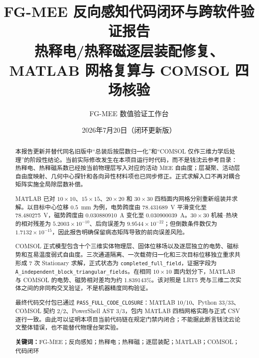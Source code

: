 \documentclass[UTF8,fontset=windows,12pt,a4paper]{ctexart}
\title{\textbf{FG-MEE 反向感知代码闭环与跨软件验证报告}\\[0.45em]
\large 热释电/热释磁逐层装配修复、MATLAB 网格复算与 COMSOL 四场核验}
\author{FG-MEE 数值验证工作台}
\date{2026年7月20日（闭环更新版）}
\begin{document}
\maketitle

\begin{abstract}
本报告更新并替代同名旧版中“总装后按层数归一化”和“COMSOL 仅作三维力学后处理”的阶段性结论。当前实际修改发生在本项目运行时代码，而不是钱沈云参考目录：热释电、热释磁系数已经按当前物理层写入对应的活动 MEE 自由度；层凝聚、活动层自由度映射、几何中心探针和各向异性材料项也已同步修正。正式求解入口不再对耦合矩阵实施全局除层数补偿。

MATLAB 已对 $10\times10$、$15\times15$、$20\times20$ 和 $30\times30$ 四档面内网格分别重新组装并求解。以目标中心位移 $0.5$~mm 为例，电势跨度由 78.431689~V 平滑变化至 78.480275~V，磁势跨度由 0.030880910~A 变化至 0.030900039~A。$30\times30$ 机械--热块的相对残差为 $5.2003\times10^{-10}$、后向误差为 $9.9544\times10^{-22}$；但倒数条件数仅为 $1.7132\times10^{-15}$，因此报告明确保留病态矩阵导致的前向误差风险。

COMSOL 正式模型包含十个三维实体物理层、固体位移场以及逐层独立的电势、磁标势和互易温度弱式自由度。三次通道隔离、一次载荷归一化和三次目标位移独立重求共形成 7 次 Stationary 求解，正式状态为 \texttt{completed\_full\_field}，证据字段为 \texttt{A\_independent\_block\_triangular\_fields}。在相同 $10\times10$ 面内划分下，MATLAB 与 COMSOL 的电势、磁势相对差均为约 1.839143\%。该对照是 LRT5 壳与三维二次实体之间的非同构交叉验证，不是机器精度同构验证。

最终代码交付包已通过 \texttt{PASS\_FULL\_CODE\_CLOSURE}：MATLAB 10/10、Python 33/33、COMSOL 契约 2/2、PowerShell AST 3/3，包内 MATLAB 四档网格实跑与正式 CSV 逐行一致。由此可以证明本项目当前代码链在规定门禁内闭合；不能据此断言钱沈云论文整体错误，也不能替代物理台架实验。

\noindent\textbf{关键词：}FG-MEE；反向感知；热释电；热释磁；逐层装配；MATLAB；COMSOL；代码闭环
\end{abstract}

\begin{center}
\end{center}
\end{document}
